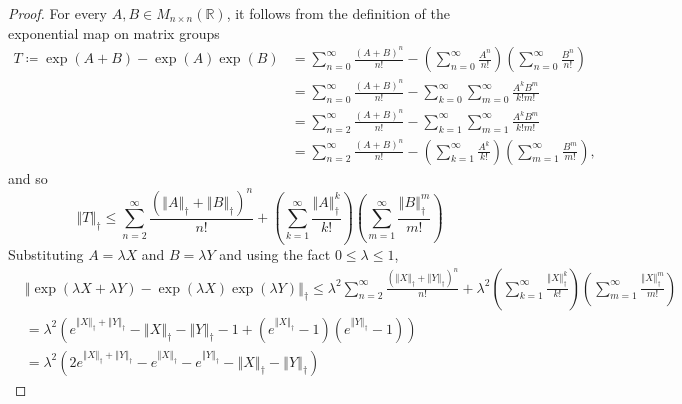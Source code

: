 \documentclass[a4paper,11pt]{scrartcl}
\numberwithin{dummy}{section}
\theoremstyle{plain}
\theoremstyle{plain}
\theoremstyle{plain}
\theoremstyle{plain}
\theoremstyle{nonumberplain}
\newtheorem{proof}{Proof}
\newcommand{\F}[1][R]{\mathbb{#1}} %
\newcommand{\Ltwonorm}[1]{\left\Vert #1 \right\Vert} %
\begin{document}
	\begin{proof}
		For every $ A, B \in M_{n \times n} (\F) $, it follows from the definition of the exponential map on matrix groups 
		\begin{align*}
		T 
		\coloneqq \exp (A + B) - \exp (A) \exp (B)
		&= \sum_{n=0}^{\infty} \frac{(A + B)^{n}}{n!} - \left( \sum_{n=0}^{\infty} \frac{A^{n}}{n!}\right) \left( \sum_{n=0}^{\infty} \frac{B^{n}}{n!}\right)  \\
		&= \sum_{n=0}^{\infty} \frac{(A + B)^{n}}{n!} - \sum_{k=0}^{\infty} \sum_{m=0}^{\infty} \frac{A^{k} B^{m}}{k! m!} \\
		&= \sum_{n=2}^{\infty} \frac{(A + B)^{n}}{n!} - \sum_{k=1}^{\infty} \sum_{m=1}^{\infty} \frac{A^{k} B^{m}}{k! m!} \\
		&= \sum_{n=2}^{\infty} \frac{(A + B)^{n}}{n!} - \left( \sum_{k=1}^{\infty} \frac{A^{k}}{k!} \right) \left( \sum_{m=1}^{\infty} \frac{B^{m}}{m!} \right),
		\end{align*}
		and so
		\begin{equation*}
		\Ltwonorm{T}_{\dag}
		\le \sum_{n=2}^{\infty} \frac{(\Ltwonorm{A}_{\dag} + \Ltwonorm{B}_{\dag})^{n}}{n!} 
			+ \left( \sum_{k=1}^{\infty} \frac{\Ltwonorm{A}_{\dag}^{k}}{k!} \right) \left( \sum_{m=1}^{\infty} \frac{\Ltwonorm{B}_{\dag}^{m}}{m!} \right)
		\end{equation*}
		Substituting $ A = \lambda X $ and $ B = \lambda Y $ and using the fact $ 0 \le \lambda \le 1 $,
		\begin{align*}
		&\Ltwonorm{\exp ( \lambda X + \lambda Y) - \exp (\lambda X) \exp (\lambda Y)}_{\dag} 
		\le \lambda^{2} \sum_{n=2}^{\infty} \frac{(\Ltwonorm{X}_{\dag} + \Ltwonorm{Y}_{\dag})^{n}}{n!} 
			+ \lambda^{2} \left( \sum_{k=1}^{\infty} \frac{\Ltwonorm{X}_{\dag}^{k}}{k!} \right) \left( \sum_{m=1}^{\infty} \frac{\Ltwonorm{X}_{\dag}^{m}}{m!} \right) \\
		&= \lambda^{2}  \left( e^{\Ltwonorm{X}_{\dag} + \Ltwonorm{Y}_{\dag}} - \Ltwonorm{X}_{\dag} - \Ltwonorm{Y}_{\dag} - 1 + \left( e^{\Ltwonorm{X}_{\dag}} - 1 \right) \left( e^{\Ltwonorm{Y}_{\dag}} - 1 \right) \right) \\
		&= \lambda^{2} \left( 2 e^{\Ltwonorm{X}_{\dag} + \Ltwonorm{Y}_{\dag}} - e^{\Ltwonorm{X}_{\dag}} - e^{\Ltwonorm{Y}_{\dag}} - \Ltwonorm{X}_{\dag} - \Ltwonorm{Y}_{\dag} \right)
		\end{align*}
	\end{proof}
	
\end{document}
